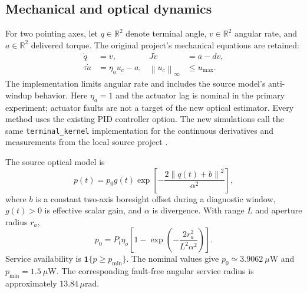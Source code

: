 \documentclass[journal]{IEEEtran}
\newcommand{\R}{\mathbb{R}}
\newcommand{\norm}[1]{\left\lVert#1\right\rVert}
\newcommand{\um}{\,\mu\mathrm{rad}}
\begin{document}
\subsection{Mechanical and optical dynamics}
For two pointing axes, let $q\in\R^2$ denote terminal angle, $v\in\R^2$ angular rate, and $a\in\R^2$ delivered torque. The original project's mechanical equations are retained:
\begin{align}
 \dot q&=v,& J\dot v&=a-dv,\\
 \tau\dot a&=\eta_a u_c-a, &
 \norm{u_c}_\infty&\leq u_{\max}.
\end{align}
The implementation limits angular rate and includes the source model's anti-windup behavior. Here $\eta_a=1$ and the actuator lag is nominal in the primary experiment; actuator faults are not a target of the new optical estimator. Every method uses the existing PID controller option. The new simulations call the same \texttt{terminal\_kernel} implementation for the continuous derivatives and measurements from the local source project \cite{sourceproject}.

The source optical model is
\begin{equation}
 p(t)=p_0g(t)\exp\!\left[-\frac{2\norm{q(t)+b}^2}{\alpha^2}\right],
 \label{eq:power}
\end{equation}
where $b$ is a constant two-axis boresight offset during a diagnostic window, $g(t)>0$ is effective scalar gain, and $\alpha$ is divergence. With range $L$ and aperture radius $r_a$,
\begin{equation}
 p_0=P_t\eta_o\left[1-\exp\!\left(-\frac{2r_a^2}{L^2\alpha^2}\right)\right].
\end{equation}
Service availability is $\mathbf{1}\{p\geq p_{\min}\}$. The nominal values give $p_0\simeq3.9062~\mu\mathrm{W}$ and $p_{\min}=1.5~\mu\mathrm{W}$. The corresponding fault-free angular service radius is approximately $13.84\um$.
\end{document}
